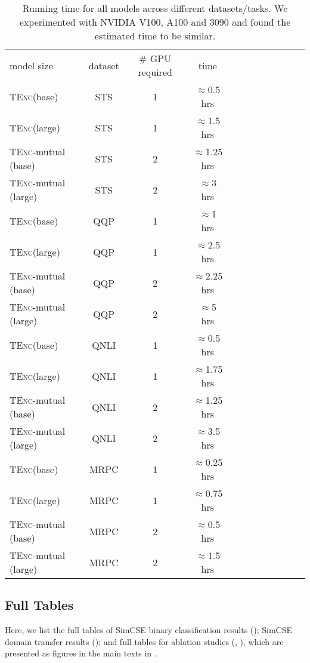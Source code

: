 \documentclass{article} \usepackage{iclr2021_conference,times}
\newcommand{\tenc}{\textsc{TEnc}\xspace}
\begin{document}
\begin{table}[!t] \centering
\small
\begin{tabular}{lccccccccccc}
\cmidrule[1.5pt]{1-10}
  model size & dataset & \# GPU required & time \\
\cmidrule[1.5pt]{1-10}
\tenc (base) & STS & 1 & $\approx$0.5 hrs \\
\tenc (large) & STS & 1 & $\approx$1.5 hrs \\
\tenc-mutual (base) & STS & 2 & $\approx$1.25 hrs \\
\tenc-mutual (large) & STS & 2 & $\approx$3 hrs \\
\cmidrule[1.0pt]{1-10}
\tenc (base) & QQP & 1 & $\approx$1 hrs \\
\tenc (large) & QQP & 1 & $\approx$2.5 hrs \\
\tenc-mutual (base) & QQP & 2 & $\approx$2.25 hrs \\
\tenc-mutual (large) & QQP & 2 & $\approx$5 hrs  \\
\cmidrule[1.0pt]{1-10}
\tenc (base) & QNLI & 1 & $\approx$0.5 hrs \\
\tenc (large) & QNLI & 1 &  $\approx$1.75 hrs \\
\tenc-mutual (base) & QNLI & 2 & $\approx$1.25 hrs \\
\tenc-mutual (large) & QNLI & 2 & $\approx$3.5 hrs \\
\cmidrule[1.0pt]{1-10}
\tenc (base) & MRPC & 1 & $\approx$0.25 hrs \\
\tenc (large) & MRPC & 1 & $\approx$0.75 hrs \\
\tenc-mutual (base) & MRPC & 2 & $\approx$0.5 hrs  \\
\tenc-mutual (large) & MRPC & 2 & $\approx$1.5 hrs  \\
\cmidrule[1.5pt]{1-10}
\end{tabular}
\caption{Running time for all models across different datasets/tasks. We experimented with NVIDIA V100, A100 and 3090 and found the estimated time to be similar.}
\label{tab:runtime}
\end{table}



\subsection{Full Tables}

Here, we list the full tables of SimCSE binary classification results (); SimCSE domain transfer results (); and full tables for ablation studies (, ), which are presented as figures in the main texts in .
\end{document}
